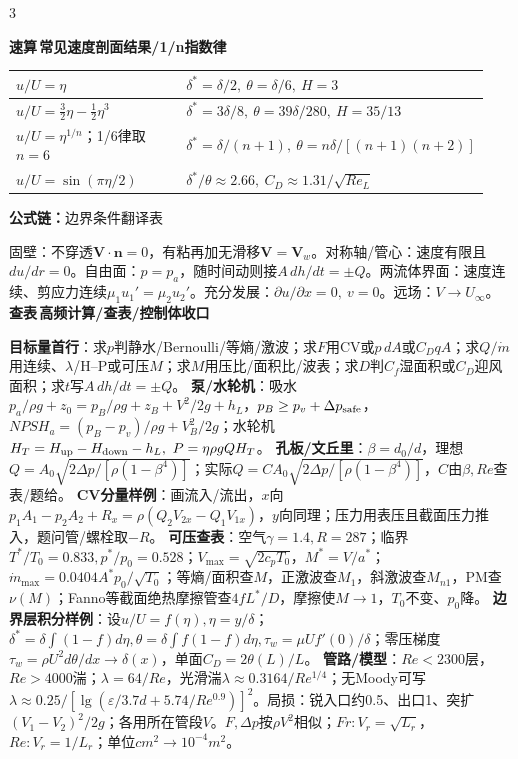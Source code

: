 \documentclass[a4paper]{article}
\newcommand{\form}[1]{{\color{M}\bfseries 公式链：}#1\par}
\newcommand{\labtag}[3]{{\bfseries\color{#1}\colorbox{#1}{\color{white}\fontsize{2.35}{2.48}\selectfont #2}\,#3}\par}
\newcommand{\lookup}[1]{\labtag{C}{查表}{#1}}
\newcommand{\formq}[1]{\form{#1}}
\newcommand{\lookq}[1]{\lookup{#1}}
\newcommand{\quickq}[1]{\labtag{F}{速算}{#1}}
\newenvironment{vfourWrap}{\par\begingroup\fontsize{2.68}{2.84}\selectfont\setlength{\fboxsep}{0.45pt}}{\par\endgroup}
\begin{document}
\begin{multicols}{3}
\begin{vfourWrap}
\quickq{常见速度剖面结果/1/n指数律}
\begin{tabular}{|p{0.42\linewidth}|p{0.52\linewidth}|}\hline
$u/U=\eta$ & $\delta^*=\delta/2,\ \theta=\delta/6,\ H=3$\\\hline
$u/U=\frac32\eta-\frac12\eta^3$ & $\delta^*=3\delta/8,\ \theta=39\delta/280,\ H=35/13$\\\hline
$u/U=\eta^{1/n}$；1/6律取$n=6$ & $\delta^*=\delta/(n+1),\ \theta=n\delta/[(n+1)(n+2)]$\\\hline
$u/U=\sin(\pi\eta/2)$ & $\delta^*/\theta\approx2.66,\ C_D\approx1.31/\sqrt{Re_L}$\\\hline
\end{tabular}
\formq{边界条件翻译表}
固壁：不穿透$\bm V\cdot\bm n=0$，有粘再加无滑移$\bm V=\bm V_w$。对称轴/管心：速度有限且$du/dr=0$。自由面：$p=p_a$，随时间动则接$A\,dh/dt=\pm Q$。两流体界面：速度连续、剪应力连续$\mu_1u_1'=\mu_2u_2'$。充分发展：$\partial u/\partial x=0,\ v=0$。远场：$V\to U_\infty$。
\lookq{高频计算/查表/控制体收口}
{\fontsize{4.35}{4.45}\selectfont
\textbf{目标量首行}：求$p$判静水/Bernoulli/等熵/激波；求$F$用CV或$p\,dA$或$C_DqA$；求$Q/\dot m$用连续、$\lambda$/H--P或可压$M$；求$M$用压比/面积比/波表；求$D$判$C_f$湿面积或$C_D$迎风面积；求$t$写$A\,dh/dt=\pm Q$。 
\textbf{泵/水轮机}：吸水$p_a/\rho g+z_0=p_B/\rho g+z_B+V^2/2g+h_L$，$p_B\ge p_v+\Delta p_{\rm safe}$，$NPSH_a=(p_B-p_v)/\rho g+V_B^2/2g$；水轮机$H_T=H_{\rm up}-H_{\rm down}-h_L,\ P=\eta\rho gQH_T$。 
\textbf{孔板/文丘里}：$\beta=d_0/d$，理想$Q=A_0\sqrt{2\Delta p/[\rho(1-\beta^4)]}$；实际$Q=C A_0\sqrt{2\Delta p/[\rho(1-\beta^4)]}$，$C$由$\beta,Re$查表/题给。 
\textbf{CV分量样例}：画流入/流出，$x$向$p_1A_1-p_2A_2+R_x=\rho(Q_2V_{2x}-Q_1V_{1x})$，$y$向同理；压力用表压且截面压力推入，题问管/螺栓取$-R$。 
\textbf{可压查表}：空气$\gamma=1.4,R=287$；临界$T^*/T_0=0.833,p^*/p_0=0.528$；$V_{\max}=\sqrt{2c_pT_0}$，$M^*=V/a^*$；$\dot m_{\max}=0.0404A^*p_0/\sqrt{T_0}$；等熵/面积查$M$，正激波查$M_1$，斜激波查$M_{n1}$，PM查$\nu(M)$；Fanno等截面绝热摩擦管查$4fL^*/D$，摩擦使$M\to1$，$T_0$不变、$p_0$降。 
\textbf{边界层积分样例}：设$u/U=f(\eta),\eta=y/\delta$；$\delta^*=\delta\int(1-f)d\eta,\theta=\delta\int f(1-f)d\eta,\tau_w=\mu Uf'(0)/\delta$；零压梯度$\tau_w=\rho U^2d\theta/dx\to\delta(x)$，单面$C_D=2\theta(L)/L$。 
\textbf{管路/模型}：$Re<2300$层，$Re>4000$湍；$\lambda=64/Re$，光滑湍$\lambda\approx0.3164/Re^{1/4}$；无Moody可写$\lambda\approx0.25/[\lg(\varepsilon/3.7d+5.74/Re^{0.9})]^2$。局损：锐入口约0.5、出口1、突扩$(V_1-V_2)^2/2g$；各用所在管段$V$。$F,\Delta p$按$\rho V^2$相似；$Fr:V_r=\sqrt{L_r}$，$Re:V_r=1/L_r$；单位$cm^2\to10^{-4}m^2$。}

\end{vfourWrap}
\end{multicols}
\end{document}

